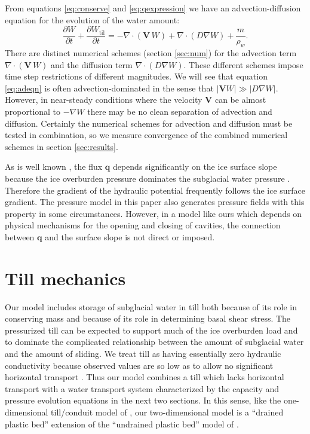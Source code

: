 \documentclass[gmd]{copernicus}   %
\newcommand{\text}{\textrm}
\newcommand\bV{\mathbf{V}}
\newcommand\bq{\mathbf{q}}
\newcommand{\Div}{\nabla\cdot}
\newcommand{\grad}{\nabla}
\newcommand{\Wtil}{W_{\text{til}}}
\begin{document}
From equations \eqref{eq:conserve} and \eqref{eq:qexpression} we have an advection-diffusion equation \citep{HundsdorferVerwer2010} for the evolution of the water amount:
\begin{equation} \label{eq:adeqn}
  \frac{\partial W}{\partial t} + \frac{\partial \Wtil}{\partial t} = - \Div\left(\bV\, W\right) + \Div \left(D \grad W\right) + \frac{m}{\rho_w}.
\end{equation}
There are distinct numerical schemes (section \ref{sec:num}) for the advection term $\Div\left(\bV\, W\right)$ and the diffusion term $\Div \left(D \grad W\right)$.  These different schemes impose time step restrictions of different magnitudes.  We will see that equation \eqref{eq:adeqn} is often advection-dominated in the sense that $|\bV W| \gg |D \grad W|$.  However, in near-steady conditions where the velocity $\bV$ can be almost proportional to $-\grad W$ there may be no clean separation of advection and diffusion.  Certainly the numerical schemes for advection and diffusion must be tested in combination, so we measure convergence of the combined numerical schemes in section \ref{sec:results}.

As is well known \citep{Clarke05}, the flux $\bq$ depends significantly on the ice surface slope because the ice overburden pressure dominates the subglacial water pressure \citep{Shreve1972}.  Therefore the gradient of the hydraulic potential frequently follows the ice surface gradient.  The pressure model in this paper also generates pressure fields with this property in some circumstances.  However, in a model like ours which depends on physical mechanisms for the opening and closing of cavities, the connection between $\bq$ and the surface slope is not direct or imposed.



\section{Till mechanics} \label{sec:tillmechanics}

Our model includes storage of subglacial water in till both because of its role in conserving mass and because of its role in determining basal shear stress.  The pressurized till can be expected to support much of the ice overburden load and to dominate the complicated relationship between the amount of subglacial water and the amount of sliding.  We treat till as having essentially zero hydraulic conductivity because observed values are so low as to allow no significant horizontal transport \citep{LingleBrown1987,Tulaczyketal2000}.  Thus our model combines a till which lacks horizontal transport with a water transport system characterized by the capacity and pressure evolution equations in the next two sections.  In this sense, like the one-dimensional till/conduit model of \cite{vanderWeletal2013}, our two-dimensional model is a ``drained plastic bed'' extension of the ``undrained plastic bed'' model of \cite{Tulaczyketal2000b}.
\end{document}
